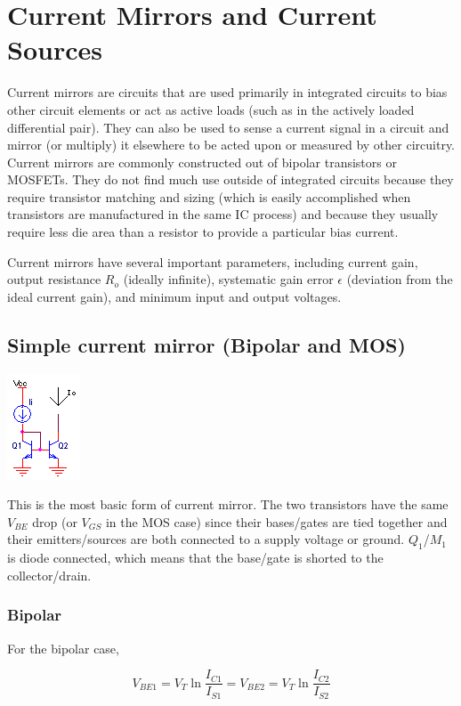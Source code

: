 \chapter{Current Mirrors and Current Sources}
Current mirrors are circuits that are used primarily in integrated circuits to bias other circuit elements or act as active loads (such as in the actively loaded differential pair). They can also be used to sense a current signal in a circuit and mirror (or multiply) it elsewhere to be acted upon or measured by other circuitry. Current mirrors are commonly constructed out of bipolar transistors or MOSFETs. They do not find much use outside of integrated circuits because they require transistor matching and sizing (which is easily accomplished when transistors are manufactured in the same IC process) and because they usually require less die area than a resistor to provide a particular bias current.
\par
Current mirrors have several important parameters, including current gain, output resistance $R_{o}$ (ideally infinite), systematic gain error $\epsilon$ (deviation from the ideal current gain), and minimum input and output voltages.

\section{Simple current mirror (Bipolar and MOS)}
\begin{center}
	\includegraphics{schematics/simplecurrentmirror.PNG}
\end{center}
This is the most basic form of current mirror. The two transistors have the same $V_{BE}$ drop (or $V_{GS}$ in the MOS case) since their bases/gates are tied together and their emitters/sources are both connected to a supply voltage or ground. $Q_{1}$/$M_{1}$ is diode connected, which means that the base/gate is shorted to the collector/drain.
\subsection{Bipolar}
For the bipolar case,

\begin{equation}
V_{BE1} = V_{T}\ln\frac{I_{C1}}{I_{S1}} = V_{BE2} = V_{T}\ln\frac{I_{C2}}{I_{S2}}
\end{equation}

